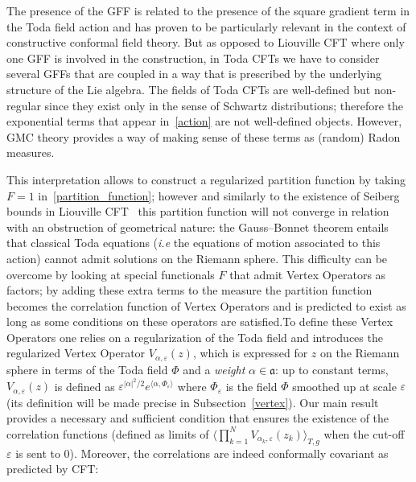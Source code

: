 \documentclass[AHL,Unicode,longabstracts,published]{cedram}
\newcommand{\frka}{\mathfrak{a}}
\newcommand*\eps{\varepsilon}
\newcommand*\green[1]{#1}
\begin{document}
The presence of the GFF is related to the presence of the square gradient term in the Toda field action and has proven to be particularly relevant in the context of constructive conformal field theory. But as opposed to Liouville CFT where only one GFF is involved in the construction, in Toda CFTs we have to consider several GFFs that are coupled in a way that is prescribed by the underlying structure of the Lie algebra. The fields of Toda CFTs are well-defined but non-regular since they exist only in the sense of Schwartz distributions; therefore the exponential terms that appear in~\eqref{action} are not well-defined objects. However, GMC theory provides a way of making sense of these terms as (random) Radon measures.

This interpretation allows to construct a regularized partition function by taking ${F=1}$ in~\eqref{partition_function}; however and similarly to the existence of Seiberg bounds in Liouville CFT~\cite{Sei90} this partition function will not converge in relation with an obstruction of geometrical nature: the Gauss--Bonnet theorem entails that classical Toda equations (\emph{i.e} the equations of motion associated to this action) cannot admit solutions on the Riemann sphere. This difficulty can be overcome by looking at special functionals $F$ that admit Vertex Operators as factors; by adding these extra terms to the measure the partition function becomes the correlation function of Vertex Operators and is predicted to exist as long as some conditions on these operators are satisfied.\linebreak To define these Vertex Operators one relies on a regularization of the Toda field and introduces the regularized Vertex Operator $V_{\alpha,\eps}(z)$, which is expressed for $z$ on the Riemann sphere in terms of the Toda field $\green\Phi$ and a \emph{weight} $\alpha\in\frka$: up to constant terms, $V_{\alpha,\eps}(z)$ is defined as $\eps^{|\alpha|^2/2}e^{\langle \alpha, \green\Phi_\eps \rangle}$ where $\green\Phi_\eps$ is the field $\green\Phi$ smoothed up at scale $\eps$ (its definition will be made precise in Subsection~\ref{vertex}). Our main result provides a necessary and sufficient condition that ensures the existence of the correlation functions (defined as limits of $\langle \prod_{k=1}^NV_{\alpha_k,\eps}(z_k)\rangle_{T,g} $ when the cut-off $\eps$ is sent to $0$). Moreover, the correlations are indeed conformally covariant as predicted by CFT:
\end{document}
